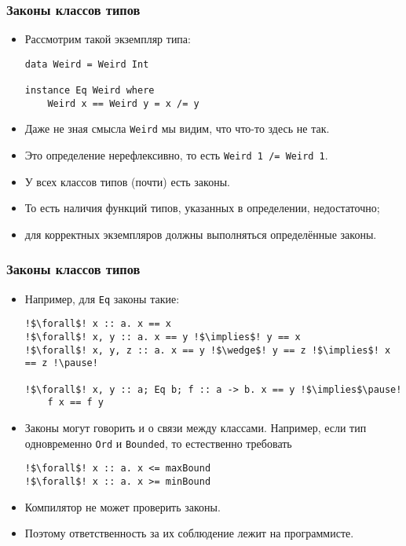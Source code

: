 \documentclass[10pt]{beamer}
\begin{document}
\begin{frame}[fragile]
\frametitle{Законы классов типов}
\begin{itemize}
    \item Рассмотрим такой экземпляр типа:
\begin{lstlisting}
data Weird = Weird Int

instance Eq Weird where
    Weird x == Weird y = x /= y
\end{lstlisting}
    \item Даже не зная смысла \lstinline|Weird| мы видим, что что-то здесь не так. \pause
    \item Это определение нерефлексивно, то есть \lstinline|Weird 1 /= Weird 1|.
    \item У всех классов типов (почти) есть законы.
    \item То есть наличия функций типов, указанных в определении, недостаточно;
    \item для корректных экземпляров должны выполняться определённые законы.    
\end{itemize}
\end{frame}

\begin{frame}[fragile]
\frametitle{Законы классов типов}
\begin{itemize}
    \item Например, для \lstinline|Eq| законы такие:\pause
\begin{lstlisting}
!$\forall$! x :: a. x == x
!$\forall$! x, y :: a. x == y !$\implies$! y == x
!$\forall$! x, y, z :: a. x == y !$\wedge$! y == z !$\implies$! x == z !\pause!

!$\forall$! x, y :: a; Eq b; f :: a -> b. x == y !$\implies$\pause! 
    f x == f y
\end{lstlisting}\pause
    \item Законы могут говорить и о связи между классами. Например, если тип одновременно \lstinline|Ord| и \lstinline|Bounded|, то естественно требовать
\begin{lstlisting}
!$\forall$! x :: a. x <= maxBound
!$\forall$! x :: a. x >= minBound
\end{lstlisting}
    \pause
    \item Компилятор не может проверить законы.
    \item Поэтому ответственность за их соблюдение лежит на программисте.
\end{itemize}
\end{frame}
\end{document}
